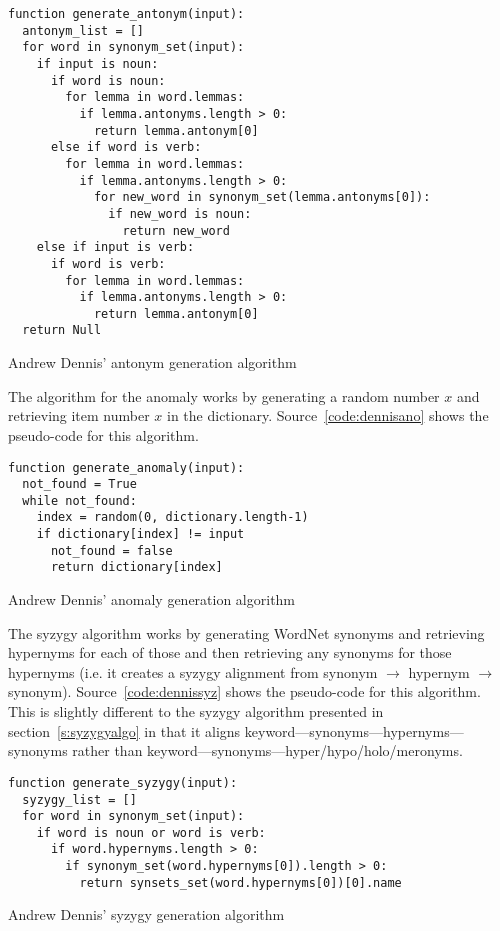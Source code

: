 \begin{listing}[!htbp] %
  \begin{verbatim}
function generate_antonym(input):
  antonym_list = []
  for word in synonym_set(input):
    if input is noun:
      if word is noun:
        for lemma in word.lemmas:
          if lemma.antonyms.length > 0:
            return lemma.antonym[0]
      else if word is verb:
        for lemma in word.lemmas:
          if lemma.antonyms.length > 0:
            for new_word in synonym_set(lemma.antonyms[0]):
              if new_word is noun:
                return new_word
    else if input is verb:
      if word is verb:
        for lemma in word.lemmas:
          if lemma.antonyms.length > 0:
            return lemma.antonym[0]
  return Null
  \end{verbatim}
\caption[Dennis' antonym generation]{Andrew Dennis' antonym generation algorithm}
\label{code:dennisanto}
\end{listing}

The algorithm for the anomaly works by generating a random number $x$ and retrieving item number $x$ in the dictionary. Source~\ref{code:dennisano} shows the pseudo-code for this algorithm.

\begin{listing}[!htbp] %
  \begin{verbatim}
function generate_anomaly(input):
  not_found = True
  while not_found:
    index = random(0, dictionary.length-1)
    if dictionary[index] != input
      not_found = false
      return dictionary[index]
  \end{verbatim}
\caption[Dennis' anomaly generation]{Andrew Dennis' anomaly generation algorithm}
\label{code:dennisano}
\end{listing}

The syzygy algorithm works by generating WordNet synonyms and retrieving hypernyms for each of those and then retrieving any synonyms for those hypernyms (i.e. it creates a syzygy alignment from synonym $\to$ hypernym $\to$ synonym). Source~\ref{code:dennissyz} shows the pseudo-code for this algorithm. This is slightly different to the syzygy algorithm presented in section~\ref{s:syzygyalgo} in that it aligns keyword---synonyms---hypernyms---synonyms rather than keyword---synonyms---hyper/\-hypo/\-holo/\-meronyms.

\begin{listing}[!htbp] %
  \begin{verbatim}
function generate_syzygy(input):
  syzygy_list = []
  for word in synonym_set(input):
    if word is noun or word is verb:
      if word.hypernyms.length > 0:
        if synonym_set(word.hypernyms[0]).length > 0:
          return synsets_set(word.hypernyms[0])[0].name
  \end{verbatim}
\caption[Dennis' syzygy generation]{Andrew Dennis' syzygy generation algorithm}
\label{code:dennissyz}
\end{listing}

